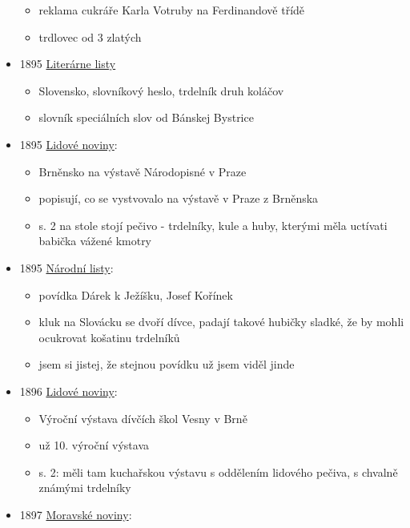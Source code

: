 \begin{itemize}
  \begin{itemize}
  \tightlist
  \item
    reklama cukráře Karla Votruby na Ferdinandově třídě
  \item
    trdlovec od 3 zlatých
  \end{itemize}
\item
  1895
  \href{https://dikda.snk.sk/uuid/uuid:dde694e6-6191-4983-bed1-e6328f0c9bf4}{Literárne
  listy}

  \begin{itemize}
  \tightlist
  \item
    Slovensko, slovníkový heslo, trdelník druh koláčov
  \item
    slovník speciálních slov od Bánskej Bystrice
  \end{itemize}
\item
  1895
  \href{https://ceskadigitalniknihovna.cz/uuid/uuid:22933190-6ef8-11ed-a5ba-005056827e51}{Lidové
  noviny}:

  \begin{itemize}
  \tightlist
  \item
    Brněnsko na výstavě Národopisné v Praze
  \item
    popisují, co se vystvovalo na výstavě v Praze z Brněnska
  \item
    s. 2 na stole stojí pečivo - trdelníky, kule a huby, kterými měla
    uctívati babička vážené kmotry
  \end{itemize}
\item
  1895
  \href{https://ceskadigitalniknihovna.cz/uuid/uuid:f392b3ef-435d-11dd-b505-00145e5790ea}{Národní
  listy}:

  \begin{itemize}
  \tightlist
  \item
    povídka Dárek k Ježíšku, Josef Kořínek
  \item
    kluk na Slovácku se dvoří dívce, padají takové hubičky sladké, že by
    mohli ocukrovat košatinu trdelníků
  \item
    jsem si jistej, že stejnou povídku už jsem viděl jinde
  \end{itemize}
\item
  1896
  \href{https://ceskadigitalniknihovna.cz/uuid/uuid:b805f3a6-435d-11dd-b505-00145e5790ea}{Lidové
  noviny}:

  \begin{itemize}
  \tightlist
  \item
    Výroční výstava dívčích škol Vesny v Brně
  \item
    už 10. výroční výstava
  \item
    s. 2: měli tam kuchařskou výstavu s oddělením lidového pečiva, s
    chvalně známými trdelníky
  \end{itemize}
\item
  1897
  \href{https://www.digitalniknihovna.cz/vkol/uuid/uuid:1a1f3964-02ac-463e-8a5b-8d7577a0ad33}{Moravské
  noviny}:


\end{itemize}
